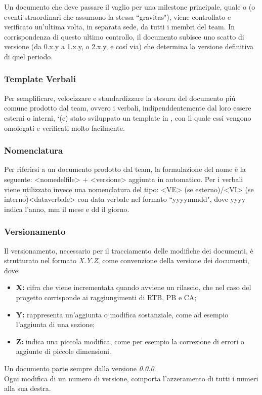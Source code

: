 Un documento che deve passare il vaglio per una milestone principale, quale  o  (o eventi straordinari che assumono la stessa ``gravitas"), viene controllato e verificato un'ultima volta, in separata sede, da tutti i membri del team.
In corrispondenza di questo ultimo controllo, il documento subisce uno scatto di versione (da 0.x.y a 1.x.y, o 2.x.y, e cosí via) che determina la versione definitiva di quel periodo.

\subsubsection{Template Verbali}
Per semplificare, velocizzare e standardizzare la stesura del documento piú comune prodotto dal team, ovvero i verbali, indipenddentemente dal loro essere esterni o interni, `(e) stato sviluppato un template in \glossterm{\LaTeX}, con il quale essi vengono omologati e verificati molto facilmente.

\subsubsection{Nomenclatura}
Per riferirsi a un documento prodotto dal team, la formulazione del nome è la seguente: <nome\textunderscore del\textunderscore file> + <versione> aggiunta in automatico. Per i verbali viene utilizzato invece una nomenclatura del tipo: <VE> (se esterno)/<VI> (se interno)\textunderscore <data\textunderscore verbale> con data verbale nel formato ``yyyy\textunderscore mm\textunderscore dd", dove yyyy indica l'anno, mm il mese e dd il giorno. 

\subsubsection{Versionamento}
Il versionamento, necessario per il tracciamento delle modifiche dei documenti, è strutturato nel formato \textit{X.Y.Z}, come convenzione della versione dei documenti, dove:
\begin{itemize}
    \item \textbf{X:} cifra che viene incrementata quando avviene un rilascio, che nel caso del progetto corrisponde ai raggiungimenti di RTB, PB e CA;
    \item \textbf{Y:} rappresenta un'aggiunta o modifica sostanziale, come ad esempio l'aggiunta di una sezione;
    \item \textbf{Z:} indica una piccola modifica, come per esempio la correzione di errori o aggiunte di piccole dimensioni.
\end{itemize}
Un documento parte sempre dalla versione \textit{0.0.0}. \\
Ogni modifica di un numero di versione, comporta l'azzeramento di tutti i numeri alla sua destra.

